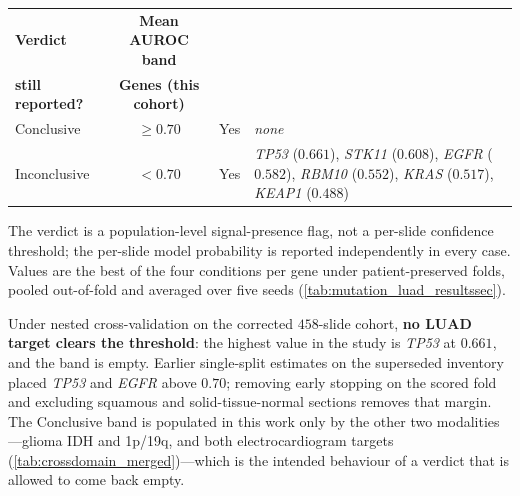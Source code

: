 \small
\setlength{\tabcolsep}{6pt}
\begin{tabularx}{\linewidth}{l c c X}
\toprule
\textbf{Verdict} & \textbf{Mean AUROC band} &
  \makecell{\textbf{Per-slide score}\\\textbf{still reported?}} &
  \textbf{Genes (this cohort)} \\
\midrule
Conclusive   & $\geq 0.70$ & Yes & \emph{none} \\
Inconclusive & $< 0.70$    & Yes &
  \textit{TP53} ($0.661$), \textit{STK11} ($0.608$),
  \textit{EGFR} ($0.582$), \textit{RBM10} ($0.552$),
  \textit{KRAS} ($0.517$), \textit{KEAP1} ($0.488$) \\
\bottomrule
\end{tabularx}
\begin{flushleft}\footnotesize
The verdict is a population-level signal-presence flag, not a
per-slide confidence threshold; the per-slide model probability is
reported independently in every case.
Values are the best of the four conditions per gene under
patient-preserved folds, pooled out-of-fold and averaged over five seeds
(\cref{tab:mutation_luad_resultssec}).
\par\smallskip
Under nested cross-validation on the corrected $458$-slide cohort,
\textbf{no LUAD target clears the threshold}: the highest value in the
study is \textit{TP53} at $0.661$, and the band is empty. Earlier
single-split estimates on the superseded inventory placed \textit{TP53}
and \textit{EGFR} above $0.70$; removing early stopping on the scored
fold and excluding squamous and solid-tissue-normal sections removes that
margin. The Conclusive band is populated in this work only by the other
two modalities---glioma IDH and 1p/19q, and both electrocardiogram
targets (\cref{tab:crossdomain_merged})---which is the intended
behaviour of a verdict that is allowed to come back empty.
\end{flushleft}
